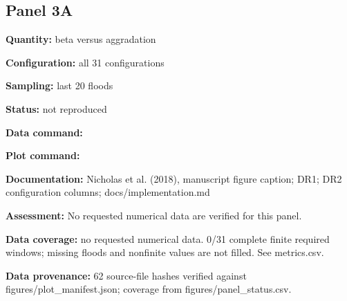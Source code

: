 \subsection*{Panel 3A}
\textbf{Quantity:} beta versus aggradation

\textbf{Configuration:} all 31 configurations

\textbf{Sampling:} last 20 floods

\textbf{Status:} not reproduced

\textbf{Data command:}\par {\small \texttt{}}\par

\textbf{Plot command:}\par {\small \texttt{}}\par

\textbf{Documentation:} Nicholas et al. (2018), manuscript figure caption; DR1; DR2 configuration columns; docs/\allowbreak{}implementation.md

\textbf{Assessment:} No requested numerical data are verified for this panel.

\textbf{Data coverage:} no requested numerical data. 0/\allowbreak{}31 complete finite required windows; missing floods and nonfinite values are not filled. See metrics.csv.

\textbf{Data provenance:} 62 source-file hashes verified against figures/\allowbreak{}plot\_\allowbreak{}manifest.json; coverage from figures/\allowbreak{}panel\_\allowbreak{}status.csv.

